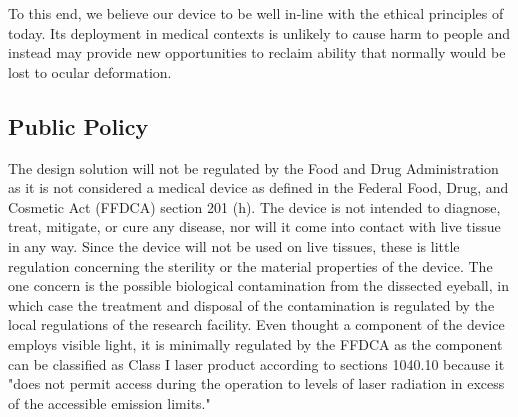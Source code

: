 \documentclass{article}
\begin{document}
To this end, we believe our device to be well in-line with the ethical
principles of today. Its deployment in medical contexts is unlikely
to cause harm to people and instead may provide new opportunities to
reclaim ability that normally would be lost to ocular deformation.


	
\subsection{Public Policy}
\label{sec:Public Policy}

The design solution will not be regulated by the Food and Drug Administration as it is
not considered a medical device as defined in the Federal Food, Drug,
and Cosmetic Act (FFDCA) section 201 (h). The device is not intended
to diagnose, treat, mitigate, or cure any disease, nor will it come into
contact with live tissue in any way. Since the device will not be used
on live tissues, these is little regulation concerning the sterility
or the material properties of the device. The one concern is the
possible biological contamination from the dissected eyeball, in which
case the treatment and disposal of the contamination is regulated by
the local regulations of the research facility.  Even thought a
component of the device employs visible light, it is minimally
regulated by the FFDCA as the component can be classified as Class I
laser product according to sections 1040.10 because it "does not
permit access during the operation to levels of laser radiation in
excess of the accessible emission limits."




\newpage
{}


\end{document}
